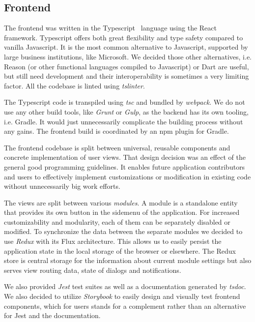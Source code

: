 \documentclass[licencjacka,en]{thesisclass}
\begin{document}
    \subsection{Frontend}

    The frontend was written in the Typescript~\cite{Typescript} language
    using the React~\cite{React} framework.
    Typescript offers both great flexibility and type safety compared to vanilla Javascript.
    It is the most common alternative to Javascript,
    supported by large business institutions, like Microsoft.
    We decided those other alternatives,
    i.e. Reason (or other functional languages compiled to Javascript) or Dart are useful,
    but still need development and their interoperability is sometimes a very limiting factor.
    All the codebase is linted using \textit{tslinter}.

    The Typescript code is transpiled
    using \textit{tsc} and bundled by \textit{webpack}.
    We do not use any other build tools, like
    \textit{Grunt} or \textit{Gulp}, as the backend has its own tooling, i.e. Gradle.
    It would just unnecessarily complicate the building process without any gains.
    The frontend build is coordinated by an npm plugin for Gradle.

    The frontend codebase is split between universal,
    reusable components
    and concrete implementation of user views.
    That design decision was an effect of the general good programming guidelines.
    It enables future application contributors and users
    to effectively implement customizations or modification
    in existing code without unnecessarily big work efforts.

    The views are split between various \textit{modules}.
    A module is a standalone entity that provides its
    own button in the sidemenu of the application.
    For increased customizability and modularity, each of them
    can be separately disabled or modified.
    To synchronize the data between the separate modules we decided
    to use \textit{Redux} with its Flux architecture.
    This allows us to easily persist the application state
    in the local storage of the browser or elsewhere.
    The Redux store is central storage for the information
    about current module settings but also serves view routing data,
    state of dialogs and notifications.

    We also provided \textit{Jest} test suites
    as well as a documentation generated by \textit{tsdoc}.
    We also decided to utilize \textit{Storybook}
    to easily design and visually test frontend components,
    which for users stands for a complement
    rather than an alternative for Jest and the documentation.
\end{document}
